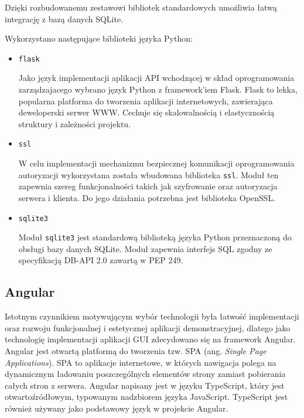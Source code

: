     		Dzięki rozbudowanemu zestawowi bibliotek standardowych umożliwia łatwą integrację z bazą danych SQLite.  

    		Wykorzystano następujące biblioteki języka Python:

    		\begin{itemize}
    			\item \texttt{flask}

    			Jako język implementacji aplikacji API wchodzącej w skład oprogramowania zarządzajacego wybrano język Python z framework'iem Flask. Flask to lekka, popularna platforma do tworzenia aplikacji internetowych, zawierająca deweloperski serwer WWW. Cechuje się skalowalnością i elastycznością struktury i zależności projektu. 

    			\item \texttt{ssl}

    			W celu implementacji mechanizmu bezpiecznej komunikacji oprogramowania autoryzacji wykorzystana została wbudowana biblioteka \texttt{ssl}. Moduł ten zapewnia szereg funkcjonalności takich jak szyfrowanie oraz autoryzacja serwera i klienta. Do jego działania potrzebna jest biblioteka OpenSSL. 

    			\item \texttt{sqlite3}

    			Moduł \texttt{sqlite3} jest standardową biblioteką języka Python przeznaczoną do obsługi bazy danych SQLite. Moduł zapewnia interfejs SQL zgodny ze specyfikacją DB-API 2.0 zawartą w PEP 249.

    		\end{itemize}

    	\subsection{Angular}

    	    Istotnym czynnikiem motywującym wybór technologii była łatwość implementacji oraz rozwoju funkcjonalnej i estetycznej aplikacji demonstracyjnej, dlatego jako technologię implementacji aplikacji GUI zdecydowano się na framework Angular. Angular jest otwartą platformą do tworzenia tzw. SPA (ang. \textit{Single Page Applications}). SPA to aplikacje internetowe, w których nawigacja polega na dynamicznym ładowaniu poszczególnych elementów strony zamiast pobierania całych stron z serwera. Angular napisany jest w języku TypeScript, który jest otwartoźródłowym, typowanym nadzbiorem języka JavaScript. TypeScript jest również używany jako podstawowy język w projekcie Angular.


